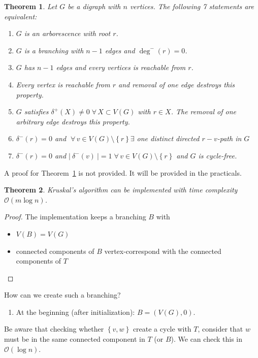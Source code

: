 \documentclass{article}
\newtheorem{theorem}{Theorem}
\newcommand{\card}[1]{\left|\:\!#1\:\!\right|}
\newcommand{\set}[1]{\left\{#1\right\}}
\newcommand{\fall}{\;\forall\,}
\newcommand{\noproof}[1]{A proof for Theorem~\ref{#1} is not provided.}
\begin{document}
\begin{theorem}\label{satz-2.4}
  Let $G$ be a digraph with $n$ vertices. The following 7 statements are equivalent:
\begin{enumerate}
  \item $G$ is an arborescence with root $r$.
  \item $G$ is a branching with $n-1$ edges and $\operatorname{deg}^-(r) = 0$.
  \item $G$ has $n-1$ edges and every vertices is reachable from $r$.
  \item Every vertex is reachable from $r$ and removal of one edge destroys this property.
  \item $G$ satisfies $\delta^+(X) \neq 0 \fall X \subset V(G)$ with $r \in X$. The removal of one arbitrary edge destroys this property.
  \item $\delta^-(r) = 0$ and $\fall v \in V(G) \setminus \set{r} \exists$ one distinct directed $r-v$-path in $G$
  \item $\delta^-(r) = 0$ and $\card{\delta^-(v)} = 1 \fall v \in V(G) \setminus \set{r}$ and $G$ is cycle-free.
\end{enumerate}
\end{theorem}

\noproof{satz-2.4} It will be provided in the practicals.

\begin{theorem}\label{satz-2.5}
  Kruskal's algorithm can be implemented with time complexity $\mathcal{O}(m \log{n})$.
\end{theorem}

\begin{proof}
  The implementation keeps a branching $B$ with
  \begin{itemize}
    \item $V(B) = V(G)$
    \item connected components of $B$ vertex-correspond with the connected components of $T$
  \end{itemize}
\end{proof}

How can we create such a branching?
\begin{enumerate}
  \item At the beginning (after initialization): $B = (V(G), 0)$.
\end{enumerate}

Be aware that checking whether $\set{v, w}$ create a cycle with $T$, consider that $w$ must be in the same connected component in $T$ (or $B$).
We can check this in $\mathcal{O}(\log{n})$.
\end{document}
